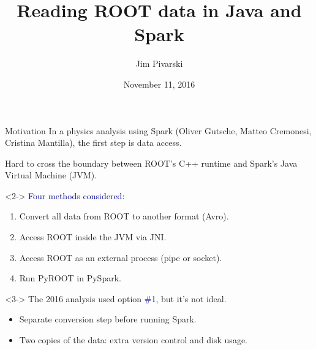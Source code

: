 \documentclass{beamer}
\title[2016-11-10-lucaetal-root4j]{Reading ROOT data in Java and Spark}
\author{Jim Pivarski}
\institute{Princeton -- DIANA}
\date{November 11, 2016}
\begin{document}

\begin{frame}
  \titlepage
\end{frame}



\begin{frame}{Motivation}
\vspace{0.25 cm}
In a physics analysis using Spark {\small (Oliver Gutsche, Matteo Cremonesi, Cristina Mantilla)}, the first step is data access.

\vspace{0.25 cm}
Hard to cross the boundary between ROOT's C++ runtime and Spark's Java Virtual Machine (JVM).

\vspace{0.25 cm}
\begin{uncoverenv}<2->
\textcolor{darkblue}{Four methods considered:}
\begin{enumerate}
\item Convert all data from ROOT to another format (Avro).
\item Access ROOT inside the JVM via JNI.
\item Access ROOT as an external process (pipe or socket).
\item Run PyROOT in PySpark.
\end{enumerate}
\end{uncoverenv}

\vspace{0.25 cm}
\begin{uncoverenv}<3->
The 2016 analysis used option \textcolor{darkblue}{\#1}, but it's not ideal.
\begin{itemize}
\item Separate conversion step before running Spark.
\item Two copies of the data: extra version control and disk usage.
\end{itemize}
\end{uncoverenv}
\end{frame}
\end{document}
